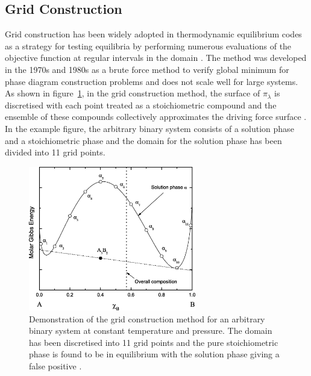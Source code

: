 	\subsection{Grid Construction}
	Grid construction has been widely adopted in thermodynamic equilibrium codes as a strategy for testing equilibria by performing numerous evaluations of the objective function at regular intervals in the domain \cite{Shobu09,Sundman85,Sundman15,Chen93a,Chen93b}. The method was developed in the 1970s and 1980s as a brute force method to verify global minimum for phase diagram construction problems and does not scale well for large systems. As shown in figure~\ref{fig:Grid_cons}, in the grid construction method, the surface of $\pi_\lambda$ is discretised with each point treated as a stoichiometric compound and the ensemble of these compounds collectively approximates the driving force surface \cite{Piro16}. In the example figure, the arbitrary binary system consists of a solution phase and a stoichiometric phase and the domain for the solution phase has been divided into 11 grid points. 
	\begin{figure}[htbp]
		\centering
		\includegraphics[width=0.65\textwidth]{figures/Grid_const}
		\caption{Demonstration of the grid construction method for an arbitrary binary system at constant temperature and pressure. The domain has been discretised into 11 grid points and the pure stoichiometric phase  is found to be in equilibrium with the solution phase giving a false positive \cite{Piro16}.}
		\label{fig:Grid_cons}
	\end{figure}


